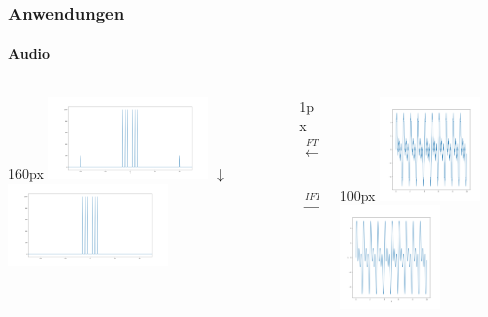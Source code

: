 \begin{frame}
    \frametitle{Anwendungen}
    \framesubtitle{Audio}

    \begin{columns}
        \begin{column}{160px}
            \centering
            \includegraphics[width=160px]{images/04-applications-audio-noisy-signal-ft.png}
            $\downarrow$
            \includegraphics[width=160px]{images/04-applications-audio-clean-signal-ft.png}
        \end{column}
        \hspace*{-25px}
        \begin{column}{1px}
            \vspace*{-13px}
            \begin{align*}
                \overset{FT}\longleftarrow \\ \\ \\ \\ \\ \\
                \overset{IFT}\longrightarrow
            \end{align*}
        \end{column}
        \hspace*{-25px}
        \begin{column}{100px}
            \centering
            \includegraphics[width=100px]{images/04-applications-audio-noisy-signal.png}
            \includegraphics[width=100px]{images/04-applications-audio-clean-signal-ift.png}
        \end{column}
    \end{columns}
\end{frame}

